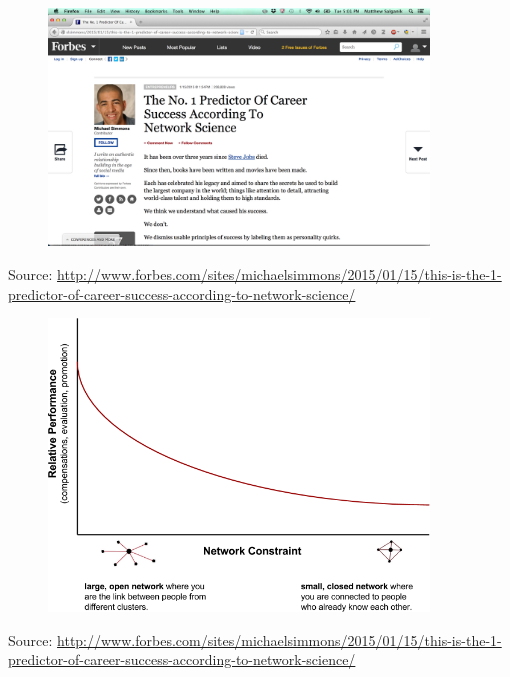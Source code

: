 \documentclass{beamer}
\begin{document}
\begin{frame}

\begin{figure}
  \centering
  \includegraphics[width=0.9\textwidth]{figures/simmons_predictor_2015}
\end{figure}

\tiny{Source: \url{http://www.forbes.com/sites/michaelsimmons/2015/01/15/this-is-the-1-predictor-of-career-success-according-to-network-science/}}


\end{frame}
\begin{frame}

\begin{figure}
  \centering
  \includegraphics[width=0.9\textwidth]{figures/Burt_Success_Final.png}
\end{figure}

\tiny{Source: \url{http://www.forbes.com/sites/michaelsimmons/2015/01/15/this-is-the-1-predictor-of-career-success-according-to-network-science/}}


\end{frame}
\end{document}
